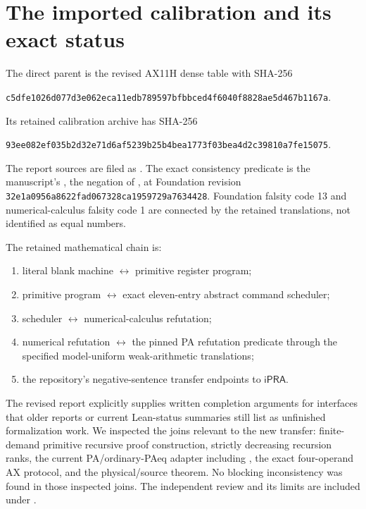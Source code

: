 \documentclass[11pt,a4paper]{article}
\newcommand{\ipra}{\mathsf{iPRA}}
\newcommand{\hash}[1]{\nolinkurl{#1}}
\begin{document}
\section{The imported calibration and its exact status}
\label{sec:calibration}

The direct parent is the revised AX11H dense table with SHA-256
\begin{center}\small
\hash{c5dfe1026d077d3e062eca11edb789597bfbbced4f6040f8828ae5d467b1167a}.
\end{center}
Its retained calibration archive has SHA-256
\begin{center}\small
\hash{93ee082ef035b2d32e71d6af5239b25b4bea1773f03bea4d2c39810a7fe15075}.
\end{center}
The report sources are filed as
.
The exact consistency predicate is the manuscript's
, the negation of , at
Foundation revision
\hash{32e1a0956a8622fad067328ca1959729a7634428}.
Foundation falsity code 13 and numerical-calculus falsity code 1 are
connected by the retained translations, not identified as equal numbers.

The retained mathematical chain is:
\begin{enumerate}
\item literal blank machine $\leftrightarrow$ primitive register program;
\item primitive program $\leftrightarrow$ exact eleven-entry abstract
command scheduler;
\item scheduler $\leftrightarrow$ numerical-calculus refutation;
\item numerical refutation $\leftrightarrow$ the pinned PA refutation
predicate through the specified model-uniform weak-arithmetic translations;
\item the repository's negative-sentence transfer endpoints to $\ipra$.
\end{enumerate}
The revised report explicitly supplies written completion arguments for
interfaces that older reports or current Lean-status summaries still list
as unfinished formalization work. We inspected the joins relevant to the
new transfer: finite-demand primitive recursive proof construction,
strictly decreasing recursion ranks, the current PA/ordinary-PAeq adapter
including , the exact four-operand AX protocol, and the
physical/source theorem. No blocking inconsistency was found in those
inspected joins. The independent review and its limits are included under
.
\end{document}
